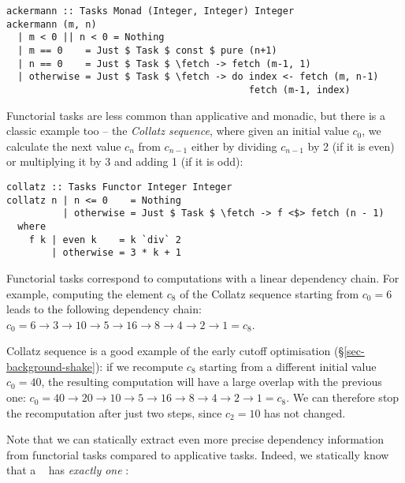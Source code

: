 \vspace{1mm}
\begin{verbatim}
ackermann :: Tasks Monad (Integer, Integer) Integer
ackermann (m, n)
  | m < 0 || n < 0 = Nothing
  | m == 0    = Just $ Task $ const $ pure (n+1)
  | n == 0    = Just $ Task $ \fetch -> fetch (m-1, 1)
  | otherwise = Just $ Task $ \fetch -> do index <- fetch (m, n-1)
                                           fetch (m-1, index)
\end{verbatim}
\vspace{1mm}

\noindent
Functorial tasks are less common than applicative and monadic, but there is a
classic example too -- the \emph{Collatz sequence}, where given an initial value
$c_0$, we calculate the next value $c_n$ from $c_{n-1}$ either by dividing
$c_{n-1}$ by 2 (if it is even) or multiplying it by 3 and adding 1 (if it is
odd):

\vspace{1mm}
\begin{verbatim}
collatz :: Tasks Functor Integer Integer
collatz n | n <= 0    = Nothing
          | otherwise = Just $ Task $ \fetch -> f <$> fetch (n - 1)
  where
    f k | even k    = k `div` 2
        | otherwise = 3 * k + 1
\end{verbatim}
\vspace{1mm}

\noindent
Functorial tasks correspond to computations with a linear dependency chain. For
example, computing the element $c_8$ of the Collatz sequence starting from
$c_0=6$ leads to the following dependency chain:
$c_0 = 6 \rightarrow 3 \rightarrow 10 \rightarrow 5 \rightarrow 16 \rightarrow 8
\rightarrow 4 \rightarrow 2 \rightarrow 1 = c_8$.

Collatz sequence is a good example of the early cutoff optimisation
(\S\ref{sec-background-shake}): if we recompute $c_8$ starting from a different
initial value $c_0=40$, the resulting computation will have a large overlap with
the previous one:
$c_0 = 40 \rightarrow 20 \rightarrow 10 \rightarrow 5 \rightarrow 16 \rightarrow
8 \rightarrow 4 \rightarrow 2 \rightarrow 1 = c_8$. We can therefore stop the
recomputation after just two steps, since $c_2=10$ has not changed.

Note that we can statically extract even more precise dependency information
from functorial tasks compared to applicative tasks. Indeed, we statically know
that a ~ has \emph{exactly one} :

